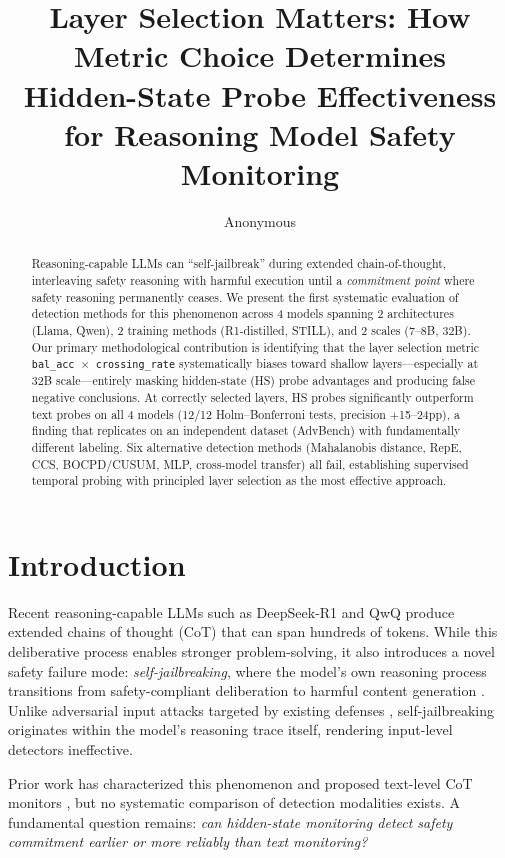 \documentclass[11pt]{article}
\title{Layer Selection Matters: How Metric Choice Determines\\Hidden-State Probe Effectiveness for Reasoning Model Safety Monitoring}
\author{Anonymous}
\begin{document}
\maketitle

\begin{abstract}
Reasoning-capable LLMs can ``self-jailbreak'' during extended chain-of-thought, interleaving safety reasoning with harmful execution until a \emph{commitment point} where safety reasoning permanently ceases.
We present the first systematic evaluation of detection methods for this phenomenon across 4 models spanning 2 architectures (Llama, Qwen), 2 training methods (R1-distilled, STILL), and 2 scales (7--8B, 32B).
Our primary methodological contribution is identifying that the layer selection metric \texttt{bal\_acc $\times$ crossing\_rate} systematically biases toward shallow layers---especially at 32B scale---entirely masking hidden-state (HS) probe advantages and producing false negative conclusions.
At correctly selected layers, HS probes significantly outperform text probes on all 4 models (12/12 Holm--Bonferroni tests, precision $+$15--24pp), a finding that replicates on an independent dataset (AdvBench) with fundamentally different labeling.
Six alternative detection methods (Mahalanobis distance, RepE, CCS, BOCPD/CUSUM, MLP, cross-model transfer) all fail, establishing supervised temporal probing with principled layer selection as the most effective approach.
\end{abstract}


\section{Introduction}

Recent reasoning-capable LLMs such as DeepSeek-R1 \cite{guo2025deepseek} and QwQ \cite{qwq32b} produce extended chains of thought (CoT) that can span hundreds of tokens.
While this deliberative process enables stronger problem-solving, it also introduces a novel safety failure mode: \emph{self-jailbreaking}, where the model's own reasoning process transitions from safety-compliant deliberation to harmful content generation \cite{ren2025selfharm}.
Unlike adversarial input attacks targeted by existing defenses \cite{li2024trajguard}, self-jailbreaking originates within the model's reasoning trace itself, rendering input-level detectors ineffective.

Prior work has characterized this phenomenon \cite{ren2025selfharm, wang2025harmthoughts} and proposed text-level CoT monitors \cite{wang2025saferemind}, but no systematic comparison of detection modalities exists.
A fundamental question remains: \emph{can hidden-state monitoring detect safety commitment earlier or more reliably than text monitoring?}
\end{document}
